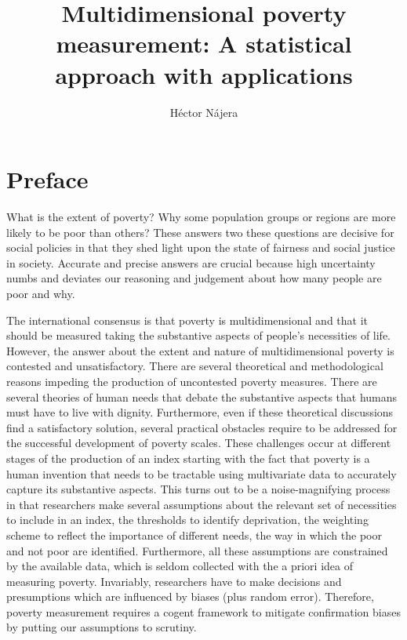 \documentclass[]{book}
\title{Multidimensional poverty measurement: A statistical approach with applications}
\author{Héctor Nájera}
\date{}
\begin{document}
\maketitle

{
\setcounter{tocdepth}{1}
\tableofcontents
}
\hypertarget{preface}{%
\chapter*{Preface}\label{preface}}

What is the extent of poverty? Why some population groups or regions are more likely to be poor than others? These answers two these questions are decisive for social policies in that they shed light upon the state of fairness and social justice in society. Accurate and precise answers are crucial because high uncertainty numbs and deviates our reasoning and judgement about how many people are poor and why.

The international consensus is that poverty is multidimensional and that it should be measured taking the substantive aspects of people's necessities of life. However, the answer about the extent and nature of multidimensional poverty is contested and unsatisfactory. There are several theoretical and methodological reasons impeding the production of uncontested poverty measures. There are several theories of human needs that debate the substantive aspects that humans must have to live with dignity. Furthermore, even if these theoretical discussions find a satisfactory solution, several practical obstacles require to be addressed for the successful development of poverty scales. These challenges occur at different stages of the production of an index starting with the fact that poverty is a human invention that needs to be tractable using multivariate data to accurately capture its substantive aspects. This turns out to be a noise-magnifying process in that researchers make several assumptions about the relevant set of necessities to include in an index, the thresholds to identify deprivation, the weighting scheme to reflect the importance of different needs, the way in which the poor and not poor are identified. Furthermore, all these assumptions are constrained by the available data, which is seldom collected with the a priori idea of measuring poverty. Invariably, researchers have to make decisions and presumptions which are influenced by biases (plus random error). Therefore, poverty measurement requires a cogent framework to mitigate confirmation biases by putting our assumptions to scrutiny.
\end{document}
